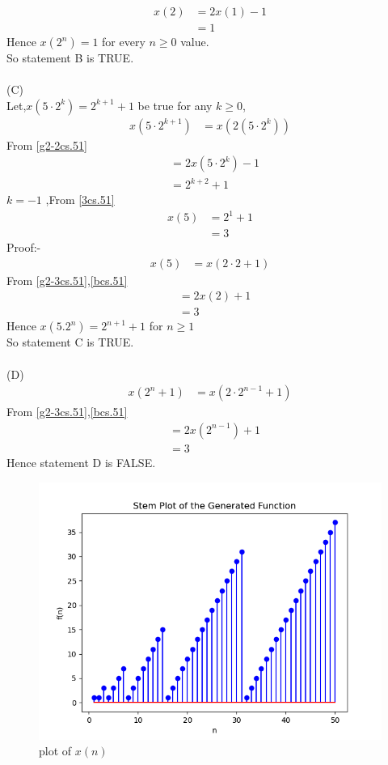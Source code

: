 \documentclass[journal,12pt,twocolumn]{IEEEtran}
\theoremstyle{remark}
\begin{document}
\begin{align}
	x(2)&=2x(1)-1\\
	&=1\label{bcs.51}
\end{align}
Hence $x(2^n)=1$ for every $n\geq0$ value.\\
So statement B is TRUE.\\
\\(C)\\
Let,$x(5\cdot2^k)=2^{k+1}+1$ be true for any $k\geq0$,
\begin{align}
	x(5\cdot2^{k+1})&=x(2(5\cdot2^k))
\end{align}
From \eqref{g2-2cs.51}
\begin{align}
	&=2x(5\cdot2^k)-1\\
	&=2^{k+2}+1\label{3cs.51}
\end{align}
$k=-1$ ,From \eqref{3cs.51}
\begin{align}
	x(5)&=2^1+1\\
	&=3
\end{align}
Proof:-
\begin{align}
        x(5)&=x(2\cdot2+1)
\end{align}
From \eqref{g2-3cs.51},\eqref{bcs.51}
\begin{align}
        &=2x(2)+1\\
        &=3
\end{align}
Hence $x(5.2^n)=2^{n+1}+1$ for $n\geq1$\\
So statement C is TRUE.\\
\\(D)
\begin{align}
	x(2^n+1)&=x(2\cdot2^{n-1}+1)
\end{align}
From \eqref{g2-3cs.51},\eqref{bcs.51}
\begin{align}
	&=2x(2^{n-1})+1\\
	&=3
\end{align}
Hence statement D is FALSE.
\begin{figure}
	\centering
	\includegraphics[width=1\columnwidth]{2022/CS/51/figures/gate2.png}
	\caption{plot of $x(n)$}
	\label{cs.51.stem}
\end{figure}







\end{document}
